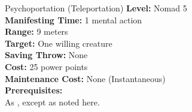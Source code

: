 {Psychoportation (Teleportation)}
{
	\textbf{Level:}
	Nomad 5\\
	\textbf{Manifesting Time:}
	1 mental action\\
	\textbf{Range:}
	9 meters\\
	\textbf{Target:}
	One willing creature\\
	\textbf{Saving Throw:}
	None\\
	\textbf{Cost:}
	25 power points\\
	\textbf{Maintenance Cost:}
	None (Instantaneous)\\
	\textbf{Prerequisites:}
	\\
}
{
	As , except as noted here.
}
